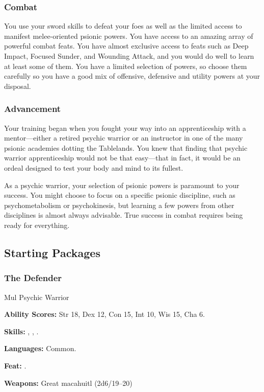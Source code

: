 \subsubsection{Combat}

You use your sword skills to defeat your foes as well as the limited access to manifest melee-oriented psionic powers. You have access to an amazing array of powerful combat feats. You have almost exclusive access to feats such as Deep Impact, Focused Sunder, and Wounding Attack, and you would do well to learn at least some of them. You have a limited selection of powers, so choose them carefully so you have a good mix of offensive, defensive and utility powers at your disposal.

\subsubsection{Advancement}
Your training began when you fought your way into an apprenticeship with a mentor---either a retired psychic warrior or an instructor in one of the many psionic academies dotting the Tablelands. You knew that finding that psychic warrior apprenticeship would not be that easy---that in fact, it would be an ordeal designed to test your body and mind to its fullest.

As a psychic warrior, your selection of psionic powers is paramount to your success. You might choose to focus on a specific psionic discipline, such as psychometabolism or psychokinesis, but learning a few powers from other disciplines is almost always advisable. True success in combat requires being ready for everything.

\subsection{Starting Packages}
\subsubsection{The Defender}

Mul Psychic Warrior

\textbf{Ability Scores:} Str 18, Dex 12, Con 15, Int 10, Wis 15, Cha 6.

\textbf{Skills:} , , .

\textbf{Languages:} Common.

\textbf{Feat:} .

\textbf{Weapons:} Great macahuitl (2d6/19--20)

